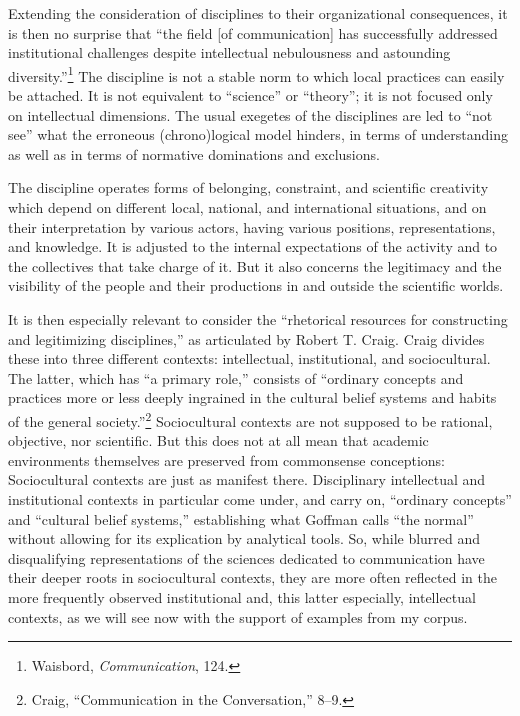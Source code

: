 \documentclass{tufte-handout}
\begin{document}
Extending the consideration of disciplines to their organizational
consequences, it is then no surprise that ``the field {[}of
communication{]} has successfully addressed institutional challenges
despite intellectual nebulousness and astounding diversity.''\footnote{Waisbord,
  \emph{Communication}, 124.} The discipline is not a stable norm to
which local practices can easily be attached. It is not equivalent to
``science'' or ``theory''; it is not focused only on intellectual
dimensions. The usual exegetes of the disciplines are led to ``not see''
what the erroneous (chrono)logical model hinders, in terms of
understanding as well as in terms of normative dominations and
exclusions.

The discipline operates forms of belonging, constraint, and scientific
creativity which depend on different local, national, and international
situations, and on their interpretation by various actors, having
various positions, representations, and knowledge. It is adjusted to the
internal expectations of the activity and to the collectives that take
charge of it. But it also concerns the legitimacy and the visibility of
the people and their productions in and outside the scientific worlds.

It is then especially relevant to consider the ``rhetorical resources
for constructing and legitimizing disciplines,'' as articulated by
Robert T. Craig. Craig divides these into three different contexts:
intellectual, institutional, and sociocultural. The latter, which has
``a primary role,'' consists of ``ordinary concepts and practices more
or less deeply ingrained in the cultural belief systems and habits of
the general society.''\footnote{Craig, ``Communication in the
  Conversation,'' 8--9.} Sociocultural contexts are not supposed to be
rational, objective, nor scientific. But this does not at all mean that
academic environments themselves are preserved from commonsense
conceptions: Sociocultural contexts are just as manifest there.
Disciplinary intellectual and institutional contexts in particular come
under, and carry on, ``ordinary concepts'' and ``cultural belief
systems,'' establishing what Goffman calls ``the normal'' without
allowing for its explication by analytical tools. So, while blurred and
disqualifying representations of the sciences dedicated to communication
have their deeper roots in sociocultural contexts, they are more often
reflected in the more frequently observed institutional and, this latter
especially, intellectual contexts, as we will see now with the support
of examples from my corpus.
\end{document}
